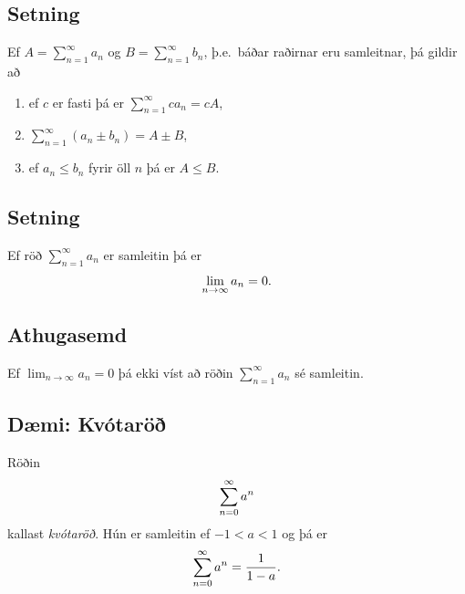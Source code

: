 \documentclass[a4paper,10pt,icelandic]{sphinxmanual}
\begin{document}
\subsection{Setning}
\label{kafli09:id7}
Ef \(A=\sum_{n=1}^\infty a_n\) og \(B=\sum_{n=1}^\infty b_n\),
þ.e. báðar raðirnar eru samleitnar, þá gildir að
\begin{enumerate}
\item {} 
ef \(c\) er fasti þá er \(\sum_{n=1}^\infty ca_n=cA\),

\item {} 
\(\sum_{n=1}^\infty (a_n\pm b_n)=A\pm B\),

\item {} 
ef \(a_n\leq b_n\) fyrir öll \(n\) þá er \(A\leq B\).

\end{enumerate}


\subsection{Setning}
\label{kafli09:id8}
Ef röð \(\sum_{n=1}^\infty a_n\) er samleitin þá er
\begin{gather}
\begin{split}\lim_{n\rightarrow\infty}a_n=0.\end{split}\notag
\end{gather}

\subsection{Athugasemd}
\label{kafli09:athugasemd}
Ef \(\lim_{n \to \infty} a_n = 0\) þá ekki víst að röðin
\(\sum_{n=1}^\infty a_n\) sé samleitin.


\subsection{Dæmi: Kvótaröð}
\label{kafli09:daemi-kvotaro}\label{kafli09:index-7}
Röðin
\begin{gather}
\begin{split}\sum_{n=0}^\infty a^n\end{split}\notag
\end{gather}
kallast \emph{kvótaröð}. Hún er samleitin ef \(-1<a<1\) og þá er
\begin{gather}
\begin{split}\sum_{n=0}^\infty a^n = \frac{1}{1-a}.\end{split}\notag
\end{gather}
\end{document}
